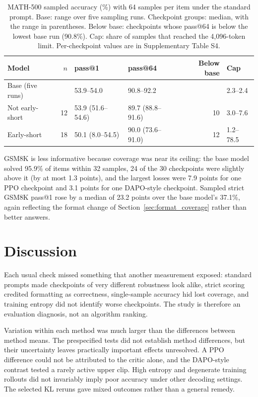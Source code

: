 \documentclass[ai,article,submit,oneauthor]{Definitions/mdpi}
\begin{document}
\begin{table}[H]
\centering
\caption{MATH-500 sampled accuracy (\%) with 64 samples per item under the standard prompt. Base: range over five sampling runs. Checkpoint groups: median, with the range in parentheses. Below base: checkpoints whose pass@64 is below the lowest base run (90.8\%). Cap: share of samples that reached the 4,096-token limit. Per-checkpoint values are in Supplementary Table S4.}
\label{tab:coverage_summary}
\begin{tabular}{lrllrl}
\toprule
Model & $n$ & pass@1 & pass@64 & Below base & Cap \\
\midrule
Base (five runs) & & 53.9--54.0 & 90.8--92.2 & & 2.3--2.4 \\
Not early-short & 12 & 53.9 (51.6--54.6) & 89.7 (88.8--91.6) & 10 & 3.0--7.6 \\
Early-short & 18 & 50.1 (8.0--54.5) & 90.0 (73.6--91.0) & 12 & 1.2--78.5 \\
\bottomrule
\end{tabular}
\end{table}

GSM8K is less informative because coverage was near its ceiling: the base model solved 95.9\% of items within 32 samples, 24 of the 30 checkpoints were slightly above it (by at most 1.3 points), and the largest losses were 7.9 points for one PPO checkpoint and 3.1 points for one DAPO-style checkpoint. Sampled strict GSM8K pass@1 rose by a median of 23.2 points over the base model's 37.1\%, again reflecting the format change of Section~\ref{sec:format_coverage} rather than better answers.


\section{Discussion}\label{sec:discussion}

Each usual check missed something that another measurement exposed: standard prompts made checkpoints of very different robustness look alike, strict scoring credited formatting as correctness, single-sample accuracy hid lost coverage, and training entropy did not identify worse checkpoints. The study is therefore an evaluation diagnosis, not an algorithm ranking.

Variation within each method was much larger than the differences between method means. The prespecified tests did not establish method differences, but their uncertainty leaves practically important effects unresolved. A PPO difference could not be attributed to the critic alone, and the DAPO-style contrast tested a rarely active upper clip. High entropy and degenerate training rollouts did not invariably imply poor accuracy under other decoding settings. The selected KL reruns gave mixed outcomes rather than a general remedy.
\end{document}
